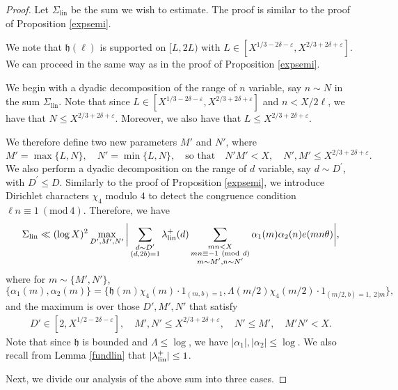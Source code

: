 \documentclass[12pt]{amsart}
\numberwithin{equation}{section}
\theoremstyle{remark}
\theoremstyle{definition}
\newcommand{\imod}[1]{\ (\mathrm{mod}\ #1)}
\begin{document}
\begin{proof}
Let $\Sigma_{\text{lin}}$ be the sum we wish to estimate. The proof is similar to the proof of Proposition \ref{expsemi}. 

We note that  $\mathfrak{h}(\ell)$ is supported on $[L, 2L)$ with $L\in [X^{1/3-2\delta-\varepsilon}, X^{2/3+2\delta+\varepsilon}]$. We can proceed in the same way as in the proof of Proposition \ref{expsemi}.

We begin with a dyadic decomposition of the range of $n$ variable, say $n\sim N$ in the sum $\Sigma_{\text{lin}}$. Note that since $L\in [X^{1/3-2\delta-\varepsilon}, X^{2/3+2\delta+\varepsilon}]$ and $n<X/2\ell$, we have that $N\leq X^{2/3+ 2\delta + \varepsilon}$. Moreover, we also have that $L\leq X^{2/3+2\delta + \varepsilon}$. 

We therefore define two new parameters $M'$ and $N'$, where 
\[M'=\max\{L, N\}, \quad N'=\min\{L, N\}, \quad \text{so that}  \quad  N'M'<X, \quad  N', M'\leq X^{2/3+2\delta+\varepsilon}.\]
We also perform a dyadic decomposition on the range of $d$ variable, say $d\sim D^\prime$, with $D^\prime \leq D$. Similarly to the proof of Proposition \ref{expsemi}, we introduce Dirichlet characters $\chi_4$ modulo $4$ to detect the congruence condition $\ell n\equiv 1\imod 4$. Therefore, we have
\begin{align}\notag
\Sigma_{\textup{lin}} \ll (\log X)^2\max_{D', M', N'}\bigg|\sum_{\substack{d\sim D^\prime\\(d, 2b)=1}}\lambda^+_{\textup{lin}}(d)\sum_{\substack{mn<X\\mn\equiv -1\imod d\\m\sim M', n\sim N'}}\alpha_1(m)\alpha_2(n)e(mn\theta)\bigg|,
\end{align}
where for $m\sim \{M', N'\}$,
\[\{\alpha_1(m), \alpha_2(m)\}=\{\mathfrak{h}(m)\chi_4(m)\cdot 1_{(m, b)=1}, \Lambda(m/2)\chi_4(m/2)\cdot 1_{(m/2, b)=1, \: 2|m}\},\]
and the maximum is over those $D', M', N'$ that satisfy
\begin{align}
\label{prop 5: eq1} D'\in [2, X^{1/2-2\delta-\varepsilon}], \quad M', N' \leq X^{2/3+2\delta+\varepsilon}, \quad N'\leq M', \quad M'N'<X.
\end{align}
Note that since $\mathfrak{h}$ is bounded and $\Lambda\leq \log$, we have $|\alpha_1|, |\alpha_2|\leq \log$. We also recall from Lemma \ref{fundlin} that $|\lambda_{\textup{lin}}^+|\leq 1$.  

Next, we divide our analysis of the above sum into three cases.


\end{proof}
\end{document}
